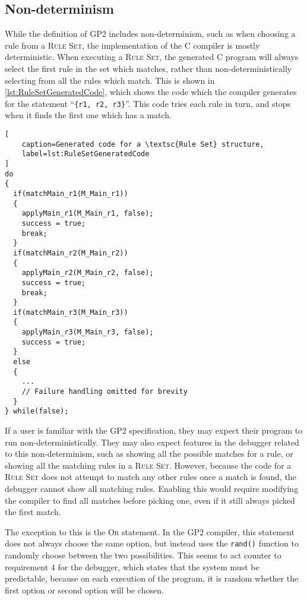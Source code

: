 \documentclass[authoryearcitations]{UoYCSproject}
\begin{document}
\subsection{Non-determinism}
\label{sec:Nondeterminism}

While the definition of GP2 includes non-determinism, such as when choosing a
rule from a \textsc{Rule Set}, the implementation of the C compiler is mostly
deterministic. When executing a \textsc{Rule Set}, the generated C program
will always select the first rule in the set which matches, rather than
non-deterministically selecting from all the rules which match. This is shown
in \autoref{lst:RuleSetGeneratedCode}, which shows the code which the compiler
generates for the statement ``\texttt{\{r1, r2, r3\}}''. This code tries each
rule in turn, and stops when it finds the first one which has a match.

\begin{lstlisting}[
    caption=Generated code for a \textsc{Rule Set} structure,
    label=lst:RuleSetGeneratedCode
]
do
{
  if(matchMain_r1(M_Main_r1))
  {
    applyMain_r1(M_Main_r1, false);
    success = true;
    break;
  }
  if(matchMain_r2(M_Main_r2))
  {
    applyMain_r2(M_Main_r2, false);
    success = true;
    break;
  }
  if(matchMain_r3(M_Main_r3))
  {
    applyMain_r3(M_Main_r3, false);
    success = true;
  }
  else
  {
    ...
    // Failure handling omitted for brevity
  }
} while(false);
\end{lstlisting}

If a user is familiar with the GP2 specification, they may expect their program
to run non-deterministically. They may also expect features in the debugger
related to this non-determinism, such as showing all the possible matches for
a rule, or showing all the matching rules in a \textsc{Rule Set}. However,
because the code for a \textsc{Rule Set} does not attempt to match any other
rules once a match is found, the debugger cannot show all matching rules.
Enabling this would require modifying the compiler to find all matches before
picking one, even if it still always picked the first match.

The exception to this is the \textsc{Or} statement. In the GP2 compiler, this
statement does not always choose the same option, but instead uses the
\texttt{rand()} function to randomly choose between the two possibilities.
This seems to act counter to requirement 4 for the debugger, which states
that the system must be predictable, because on each execution of the program,
it is random whether the first option or second option will be chosen.
\end{document}

